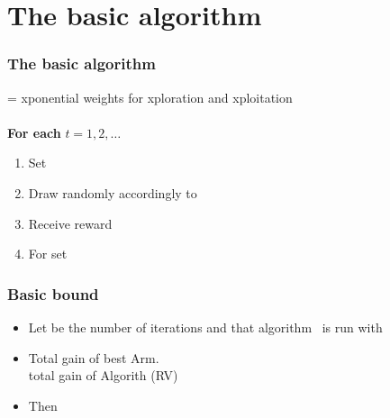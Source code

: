 \documentclass{beamer}
\begin{document}
\section{The basic algorithm}

\begin{frame}
\frametitle{The basic algorithm }
 = xponential weights for xploration and xploitation\\~\\

{\bf For each} $t=1,2,\ldots$
\begin{enumerate}
\item
Set
\R{\[
        \p{i}{t} = (1-\gamma)\frac{\wt{t}{i}}{\sum_{j=1}^K \wt{t}{j}} + \frac{\gamma}{K}
        \qquad i=1,\ldots,K.
\]}
\item      
Draw  randomly accordingly to 
\item
Receive reward \R{$\xit \in [0,1]$}
\item 
For  set 
\end{enumerate}
\end{frame}


\begin{frame}
\frametitle{Basic bound}
\begin{itemize}
\item
Let  be the number of iterations and that algorithm~\B{$\Aest$}
is run with 
\item
  \R{$\Gbest=$} Total gain of best Arm.\\
   total gain of Algorith (RV)
\item Then
\end{itemize}

\end{frame}
\end{document}
